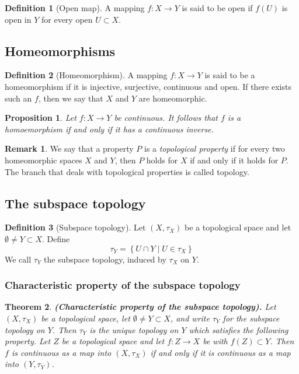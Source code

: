 \documentclass[11pt,a4paper]{article}
\theoremstyle{definition}
\newtheorem{definition}{Definition}[section]
\newtheorem{remark}{Remark}[section]
\theoremstyle{plain}
\newtheorem{theorem}{Theorem}[section]
\newtheorem{proposition}[theorem]{Proposition}
\newcommand{\set}[2]{ \left\{ #1 \mid #2 \right\} }
\renewcommand{\tt}[1]{\textnormal{\textbf{(#1).}}} %
\begin{document}
  \begin{definition}[Open map]
    A mapping $f \colon X \to Y$ is said to be open if $f(U)$ is open in $Y$
    for every open $U \subset X$.
  \end{definition}
  
  \subsection{Homeomorphisms}

  \begin{definition}[Homeomorphism]
    A mapping $f \colon X \to Y$ is said to be a homeomorphism if it is
    injective, surjective, continuous and open. If there exists such an $f$, 
    then we say that $X$ and $Y$ are homeomorphic.
  \end{definition}

  \begin{proposition}
    Let $f \colon X \to Y$ be continuous. It follows that $f$ is a 
    homoemorphism if and only if it has a continuous inverse.
  \end{proposition}

  \begin{remark}
    We say that a property $P$ is a \emph{topological property} if for every
    two homeomorphic spaces $X$ and $Y$, then $P$ holds for $X$ if and only
    if it holds for $P$. The branch that deals with topological properties
    is called topology.
  \end{remark}

  \subsection{The subspace topology}

  \begin{definition}[Subspace topology]
    Let $(X,\tau_X)$ be a topological space and let $\emptyset \neq Y \subset 
    X$. Define
    \[
      \tau_Y = \set{U \cap Y}{U \in \tau_X}
    \]
    We call $\tau_Y$ the subspace topology, induced by $\tau_X$ on $Y$.
  \end{definition}
  
  \subsubsection{Characteristic property of the subspace topology}

  \begin{theorem}
    \tt{Characteristic property of the subspace topology}
    Let $(X, \tau_X)$
    be a topological space, let $\emptyset \neq Y \subset X$, and write 
    $\tau_Y$ for the subspace topology on $Y$. Then $\tau_Y$ is the unique 
    topology on $Y$ which satisfies the following property. Let $Z$
    be a topological space and let $f \colon Z \to X$ be with 
    $f(Z) \subset Y$. Then $f$ is continuous as a map into $(X, \tau_X)$ if 
    and only if it is continuous as a map into $(Y, \tau_Y)$.
  \end{theorem}
\end{document}
